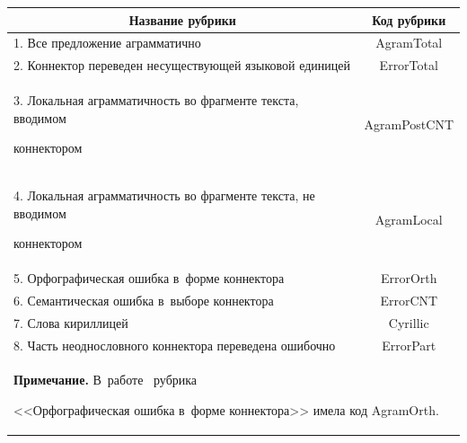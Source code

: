 \begin{table}[h]\small %


\vspace*{-12pt}


\begin{center}




\vspace*{2ex}





\begin{tabular}{|l|c|}


\hline


\multicolumn{1}{|c|}{Название рубрики}&Код рубрики\\


\hline


1. Все предложение аграмматично&AgramTotal\\


2. Коннектор переведен несуществующей языковой единицей&ErrorTotal\\


3. Локальная аграмматичность во фрагменте текста, вводимом 


коннектором&AgramPostCNT\\


4. Локальная аграмматичность во фрагменте текста, не вводимом 


коннектором&AgramLocal\\


5. Орфографическая ошибка в~форме коннектора&ErrorOrth\\


6. Семантическая ошибка в~выборе коннектора&ErrorCNT\\


7. Слова кириллицей&Cyrillic\\


8. Часть неоднословного коннектора переведена ошибочно&ErrorPart\\


\hline


   \multicolumn{2}{l}{\footnotesize \hspace*{2mm}\textbf{Примечание.} В~работе~\cite{16-gz} рубрика 


<<Орфографическая ошибка в~форме коннектора>> имела код AgramOrth.}


   \end{tabular}


   \end{center}


   \vspace*{-12pt}


   \end{table}


